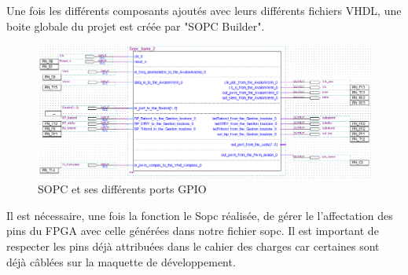   Une fois les différents composants ajoutés avec leurs différents fichiers VHDL, une boite globale du projet est créée par "SOPC Builder".
\vspace{0.5cm}
  \begin{figure}[h]
    \begin{center}
      \includegraphics[width=\textwidth]{images/sopc_bloc.png}
      \caption{SOPC et ses différents ports GPIO}
    \end{center}
  \end{figure}

  Il est nécessaire, une fois la fonction le Sopc réalisée, de gérer le l'affectation des pins du FPGA avec celle générées dans notre fichier sopc. Il est important de respecter les pins déjà attribuées dans le cahier des charges car certaines sont déjà câblées sur la maquette de développement.